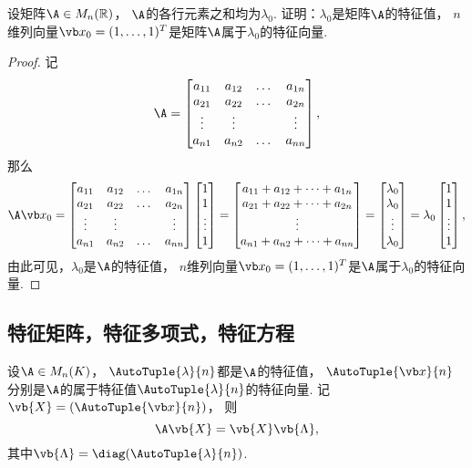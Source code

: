 \begin{example}
设矩阵\(\A \in M_n(\mathbb{R})\)，
\(\A\)的各行元素之和均为\(\lambda_0\).
证明：\(\lambda_0\)是矩阵\(\A\)的特征值，
\(n\)维列向量\(\x_0=(1,\dotsc,1)^T\)是矩阵\(\A\)属于\(\lambda_0\)的特征向量.
\begin{proof}
记\[
	\A
	= \begin{bmatrix}
		a_{11} & a_{12} & \dots & a_{1n} \\
		a_{21} & a_{22} & \dots & a_{2n} \\
		\vdots & \vdots & & \vdots \\
		a_{n1} & a_{n2} & \dots & a_{nn}
	\end{bmatrix},
\]
那么\[
	\A \x_0
	= \begin{bmatrix}
		a_{11} & a_{12} & \dots & a_{1n} \\
		a_{21} & a_{22} & \dots & a_{2n} \\
		\vdots & \vdots & & \vdots \\
		a_{n1} & a_{n2} & \dots & a_{nn}
	\end{bmatrix}
	\begin{bmatrix}
		1 \\ 1 \\ \vdots \\ 1
	\end{bmatrix}
	= \begin{bmatrix}
		a_{11} + a_{12} + \dotsb + a_{1n} \\
		a_{21} + a_{22} + \dotsb + a_{2n} \\
		\vdots \\
		a_{n1} + a_{n2} + \dotsb + a_{nn}
	\end{bmatrix}
	= \begin{bmatrix}
		\lambda_0 \\ \lambda_0 \\ \vdots \\ \lambda_0
	\end{bmatrix}
	= \lambda_0
	\begin{bmatrix}
		1 \\ 1 \\ \vdots \\ 1
	\end{bmatrix},
\]
由此可见，\(\lambda_0\)是\(\A\)的特征值，
\(n\)维列向量\(\x_0=(1,\dotsc,1)^T\)是\(\A\)属于\(\lambda_0\)的特征向量.
\end{proof}
\end{example}

\subsection{特征矩阵，特征多项式，特征方程}
\begin{proposition}
设\(\A \in M_n(K)\)，
\(\AutoTuple{\lambda}{n}\)都是\(\A\)的特征值，
\(\AutoTuple{\x}{n}\)分别是\(\A\)的属于特征值\(\AutoTuple{\lambda}{n}\)的特征向量.
记\(\vb{X} = (\AutoTuple{\x}{n})\)，
则\[
	\A \vb{X} = \vb{X} \vb{\Lambda},
\]
其中\(\vb{\Lambda} = \diag(\AutoTuple{\lambda}{n})\).
\end{proposition}

